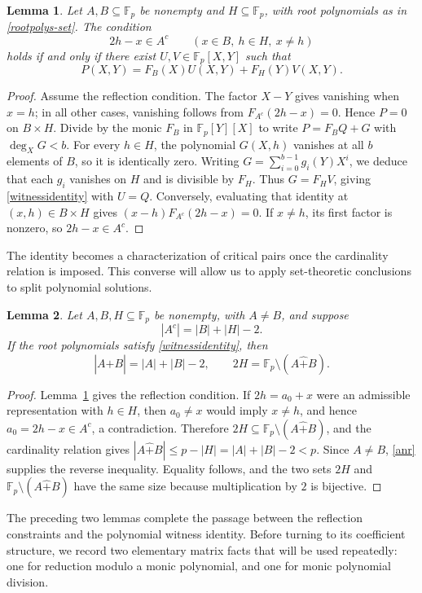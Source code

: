 \documentclass[12pt]{article}
\newtheorem{lemma}{Lemma}[section]
\theoremstyle{remark}
\newcommand{\F}{\mathbb{F}_p}
\newcommand{\rs}{\mathbin{\widehat+}}
\begin{document}
\begin{lemma}\label{gridlemma}
Let $A,B\subseteq\F$ be nonempty and $H\subseteq\F$, with root
polynomials as in \eqref{rootpolys-set}.  The condition
\[
 2h-x\in A^c\qquad(x\in B,\ h\in H,\ x\ne h)
\]
holds if and only if there exist $U,V\in\F[X,Y]$ such that
\begin{equation}\label{witnessidentity}
 P(X,Y)=F_B(X)U(X,Y)+F_H(Y)V(X,Y).
\end{equation}
\end{lemma}
\begin{proof}
Assume the reflection condition.  The factor $X-Y$ gives vanishing when $x=h$; in all other cases,
vanishing follows from $F_{A^c}(2h-x)=0$.  Hence $P=0$ on
$B\times H$.  Divide by the monic $F_B$ in $\F[Y][X]$ to write
$P=F_BQ+G$ with $\deg_XG<b$.  For every $h\in H$, the polynomial
$G(X,h)$ vanishes at all $b$ elements of $B$, so it is identically zero.
Writing $G=\sum_{i=0}^{b-1}g_i(Y)X^i$, we deduce that each $g_i$
vanishes on $H$ and is divisible by $F_H$.  Thus $G=F_HV$, giving
\eqref{witnessidentity} with $U=Q$.
Conversely, evaluating that identity at $(x,h)\in B\times H$ gives
$(x-h)F_{A^c}(2h-x)=0$.  If $x\ne h$, its first factor is nonzero,
so $2h-x\in A^c$.
\end{proof}

The identity becomes a characterization of critical pairs once the
cardinality relation is imposed.  This converse will allow us to apply
set-theoretic conclusions to split polynomial solutions.

\begin{lemma}\label{reconstruction}
Let $A,B,H\subseteq\F$ be nonempty, with $A\ne B$, and suppose
\[
 |A^c|=|B|+|H|-2.
\]
If the root polynomials satisfy \eqref{witnessidentity}, then
\[
 |A\rs B|=|A|+|B|-2,\qquad 2H=\F\setminus(A\rs B).
\]
\end{lemma}
\begin{proof}
Lemma~\ref{gridlemma} gives the reflection condition.  If
$2h=a_0+x$ were an admissible representation with $h\in H$, then
$a_0\ne x$ would imply $x\ne h$, and hence
$a_0=2h-x\in A^c$, a contradiction.  Therefore
$2H\subseteq\F\setminus(A\rs B)$, and the cardinality relation gives
$|A\rs B|\le p-|H|=|A|+|B|-2<p$.  Since $A\ne B$, \eqref{anr} supplies the reverse inequality.
Equality follows, and the two sets $2H$ and $\F\setminus(A\rs B)$
have the same size because multiplication by $2$ is bijective.
\end{proof}

The preceding two lemmas complete the passage between the reflection
constraints and the polynomial witness identity.  Before turning to its
coefficient structure, we record two elementary matrix facts that will be
used repeatedly: one for reduction modulo a monic polynomial, and one for
monic polynomial division.
\end{document}
